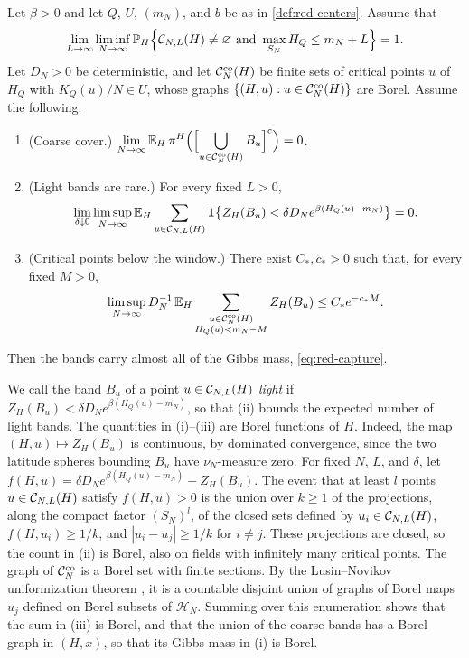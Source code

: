 \begin{proposition}\label{prop:red-capture}
Let $\beta>0$ and let $Q$, $U$, $(m_N)$, and $b$ be as in \cref{def:red-centers}. Assume that
\begin{equation}\label{eq:red-ground}
\lim_{L\to\infty}\liminf_{N\to\infty}\Pp_H\Bigl\{\cC_{N,L}(H)\ne\varnothing\ \text{and}\ \max_{S_N}H_Q\le m_N+L\Bigr\}=1.
\end{equation}
Let $D_N>0$ be deterministic, and let $\mathcal C^{\mathrm{co}}_N(H)$ be finite sets of critical points $u$ of $H_Q$ with $K_Q(u)/N\in U$, whose graphs $\{(H,u):u\in\mathcal C^{\mathrm{co}}_N(H)\}$ are Borel. Assume the following.
\begin{enumerate}[label=(\roman*)]
\item (Coarse cover.) $\displaystyle\lim_{N\to\infty}\mathbb E_H\,\pi^H\Bigl(\Bigl[\bigcup_{u\in\mathcal C^{\mathrm{co}}_N(H)}B_u\Bigr]^c\Bigr)=0$.
\item (Light bands are rare.) For every fixed $L>0$,
\begin{equation*}
\lim_{\delta\downarrow0}\limsup_{N\to\infty}\mathbb E_H\sum_{u\in\mathcal C_{N,L}(H)}\mathbf 1\bigl\{Z_H(B_u)<\delta D_Ne^{\beta(H_Q(u)-m_N)}\bigr\}=0.
\end{equation*}
\item (Critical points below the window.) There exist $C_*,c_*>0$ such that, for every fixed $M>0$,
\begin{equation*}
\limsup_{N\to\infty}D_N^{-1}\,\mathbb E_H\sum_{\substack{u\in\mathcal C^{\mathrm{co}}_N(H)\\H_Q(u)<m_N-M}}Z_H(B_u)\le C_*e^{-c_*M}.
\end{equation*}
\end{enumerate}
Then the bands carry almost all of the Gibbs mass, \eqref{eq:red-capture}.
\end{proposition}

We call the band $B_u$ of a point $u\in\mathcal C_{N,L}(H)$ \emph{light} if $Z_H(B_u)<\delta D_Ne^{\beta(H_Q(u)-m_N)}$, so that (ii) bounds the expected number of light bands. The quantities in (i)--(iii) are Borel functions of $H$. Indeed, the map $(H,u)\mapsto Z_H(B_u)$ is continuous, by dominated convergence, since the two latitude spheres bounding $B_u$ have $\nu_N$-measure zero. For fixed $N$, $L$, and $\delta$, let $f(H,u)=\delta D_Ne^{\beta(H_Q(u)-m_N)}-Z_H(B_u)$. The event that at least $l$ points $u\in\mathcal C_{N,L}(H)$ satisfy $f(H,u)>0$ is the union over $k\ge1$ of the projections, along the compact factor $(S_N)^l$, of the closed sets defined by $u_i\in\mathcal C_{N,L}(H)$, $f(H,u_i)\ge1/k$, and $|u_i-u_j|\ge1/k$ for $i\ne j$. These projections are closed, so the count in (ii) is Borel, also on fields with infinitely many critical points. The graph of $\mathcal C^{\mathrm{co}}_N$ is a Borel set with finite sections. By the Lusin--Novikov uniformization theorem \cite[Theorem~18.10]{Kechris1995}, it is a countable disjoint union of graphs of Borel maps $u_j$ defined on Borel subsets of $\mathcal H_N$. Summing over this enumeration shows that the sum in (iii) is Borel, and that the union of the coarse bands has a Borel graph in $(H,x)$, so that its Gibbs mass in (i) is Borel.

